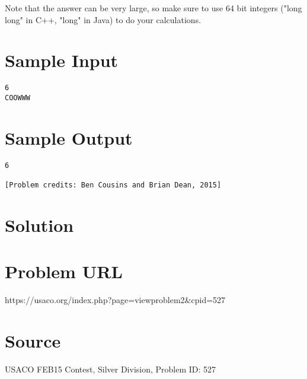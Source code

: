 \documentclass[12pt]{article}
\begin{document}
Note that the answer can be very large, so make sure to use 64 bit integers ("long long" in C++, "long" in Java) to do your calculations.

\section*{Sample Input}
\begin{verbatim}
6
COOWWW
\end{verbatim}

\section*{Sample Output}
\begin{verbatim}
6

[Problem credits: Ben Cousins and Brian Dean, 2015]
\end{verbatim}

\section*{Solution}


\section*{Problem URL}
https://usaco.org/index.php?page=viewproblem2&cpid=527

\section*{Source}
USACO FEB15 Contest, Silver Division, Problem ID: 527
\end{document}
